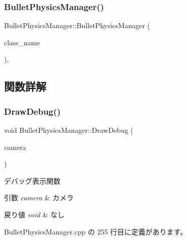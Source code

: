 \subsubsection{\texorpdfstring{Bullet\+Physics\+Manager()}{BulletPhysicsManager()}\hspace{0.1cm}{\footnotesize\ttfamily [2/2]}}
{\footnotesize\ttfamily Bullet\+Physics\+Manager\+::\+Bullet\+Physics\+Manager (\begin{DoxyParamCaption}\item[{const \mbox{\hyperlink{class_bullet_physics_manager}{Bullet\+Physics\+Manager}} \&}]{class\+\_\+name }\end{DoxyParamCaption})\hspace{0.3cm}{\ttfamily [private]}, {\ttfamily [delete]}}



\subsection{関数詳解}
\mbox{\label{class_bullet_physics_manager_aeebd0a40ebc6ce33aafc9cf1ad89fd19}} 
\subsubsection{\texorpdfstring{Draw\+Debug()}{DrawDebug()}}
{\footnotesize\ttfamily void Bullet\+Physics\+Manager\+::\+Draw\+Debug (\begin{DoxyParamCaption}\item[{\mbox{\hyperlink{class_camera}{Camera}} $\ast$}]{camera }\end{DoxyParamCaption})}



デバッグ表示関数 


\begin{DoxyParams}{引数}
{\em camera} & カメラ \\
\hline
\end{DoxyParams}

\begin{DoxyRetVals}{戻り値}
{\em void} & なし \\
\hline
\end{DoxyRetVals}


 Bullet\+Physics\+Manager.\+cpp の 255 行目に定義があります。

